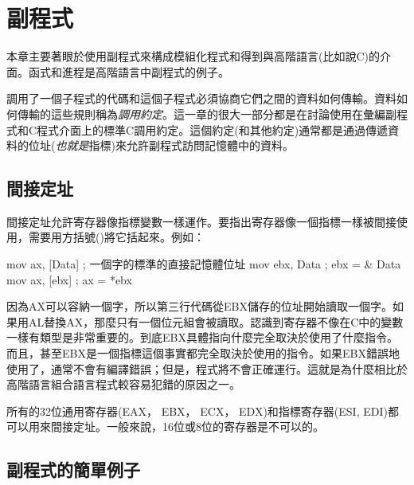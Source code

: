 \chapter{副程式}

本章主要著眼於使用副程式來構成模組化程式和得到與高階語言(比如說C)的介面。函式和進程是高階語言中副程式的例子。

調用了一個子程式的代碼和這個子程式必須協商它們之間的資料如何傳輸。資料如何傳輸的這些規則稱為\emph{調用約定}。這一章的很大一部分都是在討論使用在彙編副程式和C程式介面上的標準C調用約定。這個約定(和其他約定)通常都是通過傳遞資料的位址(\emph{也就是}指標)來允許副程式訪問記憶體中的資料。

\section{間接定址}

間接定址允許寄存器像指標變數一樣運作。要指出寄存器像一個指標一樣被間接使用，需要用方括號({\code []})將它括起來。例如：
\begin{AsmCodeListing}[frame=none]
      mov    ax, [Data]     ; 一個字的標準的直接記憶體位址
      mov    ebx, Data      ; ebx = & Data
      mov    ax, [ebx]      ; ax = *ebx
\end{AsmCodeListing}
因為AX可以容納一個字，所以第三行代碼從EBX儲存的位址開始讀取一個字。如果用AL替換AX，那麼只有一個位元組會被讀取。認識到寄存器不像在C中的變數一樣有類型是非常重要的。到底EBX具體指向什麼完全取決於使用了什麼指令。而且，甚至EBX是一個指標這個事實都完全取決於使用的指令。如果EBX錯誤地使用了，通常不會有編譯錯誤；但是，程式將不會正確運行。這就是為什麼相比於高階語言組合語言程式較容易犯錯的原因之一。

所有的32位通用寄存器(EAX， EBX， ECX， EDX)和指標寄存器(ESI, EDI)都可以用來間接定址。一般來說，16位或8位的寄存器是不可以的。

\section{副程式的簡單例子}

